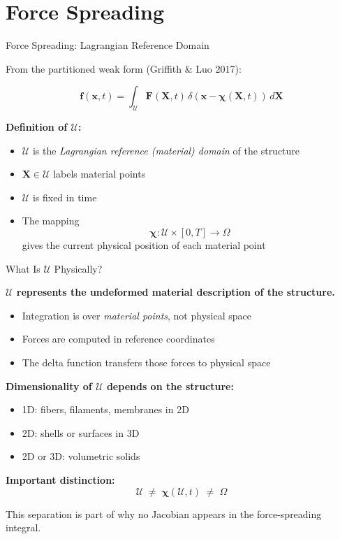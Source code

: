\documentclass{beamer}
\begin{document}
\section{Force Spreading}

\begin{frame}{Force Spreading: Lagrangian Reference Domain}

From the partitioned weak form (Griffith \& Luo 2017):

\[
\mathbf{f}(\mathbf{x},t)
=
\int_{\mathcal{U}}
\mathbf{F}(\mathbf{X},t)\,
\delta(\mathbf{x}-\boldsymbol{\chi}(\mathbf{X},t))\,d\mathbf{X}
\]

\medskip

\textbf{Definition of $\mathcal{U}$:}
\begin{itemize}
    \item $\mathcal{U}$ is the \emph{Lagrangian reference (material) domain} of the structure
    \item $\mathbf{X} \in \mathcal{U}$ labels material points
    \item $\mathcal{U}$ is fixed in time
    \item The mapping
    \[
    \boldsymbol{\chi} : \mathcal{U} \times [0,T] \rightarrow \Omega
    \]
    gives the current physical position of each material point
\end{itemize}

\end{frame}

\begin{frame}{What Is $\mathcal{U}$ Physically?}

\textbf{$\mathcal{U}$ represents the undeformed material description of the structure.}

\medskip

\begin{itemize}
    \item Integration is over \emph{material points}, not physical space
    \item Forces are computed in reference coordinates
    \item The delta function transfers those forces to physical space
\end{itemize}

\medskip

\textbf{Dimensionality of $\mathcal{U}$ depends on the structure:}
\begin{itemize}
    \item 1D: fibers, filaments, membranes in 2D
    \item 2D: shells or surfaces in 3D
    \item 2D or 3D: volumetric solids
\end{itemize}

\medskip

\textbf{Important distinction:}
\[
\mathcal{U}
\;\neq\;
\boldsymbol{\chi}(\mathcal{U},t)
\;\neq\;
\Omega
\]

\medskip

This separation is part of why no Jacobian appears in the force-spreading integral.

\end{frame}
\end{document}
